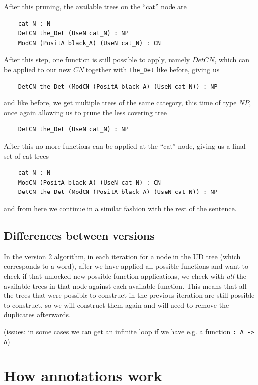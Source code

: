 After this pruning, the available trees on the ``cat'' node are
\begin{lstlisting}
    cat_N : N
    DetCN the_Det (UseN cat_N) : NP
    ModCN (PositA black_A) (UseN cat_N) : CN
\end{lstlisting}
After this step, one function is still possible to apply, namely $DetCN$, which can be applied to our new $CN$ together with \lstinline{the_Det} like before, giving us
\begin{lstlisting}
    DetCN the_Det (ModCN (PositA black_A) (UseN cat_N)) : NP
\end{lstlisting}
and like before, we get multiple trees of the same category, this time of type $NP$, once again allowing us to prune the less covering tree
\begin{lstlisting}
    DetCN the_Det (UseN cat_N) : NP
\end{lstlisting}

After this no more functions can be applied at the ``cat'' node, giving us a final set of cat trees
\begin{lstlisting}
    cat_N : N
    ModCN (PositA black_A) (UseN cat_N) : CN
    DetCN the_Det (ModCN (PositA black_A) (UseN cat_N)) : NP
\end{lstlisting}

and from here we continue in a similar fashion with the rest of the sentence.



\subsection{Differences between versions}

In the version 2 algorithm, in each iteration for a node in the UD tree (which corresponds to a word), after we have applied all possible functions and want to check if that unlocked new possible function applications, we check with \emph{all} the available trees in that node against each available function. This means that all the trees that were possible to construct in the previous iteration are still possible to construct, so we will construct them again and will need to remove the duplicates afterwards.



(issues: in some cases we can get an infinite loop if we have e.g. a function \lstinline{: A -> A})



\section{How annotations work}